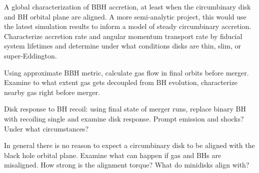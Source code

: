 A global characterization of BBH accretion, at least when the circumbinary disk and BH orbital plane are aligned.  A more semi-analytic project, this would use the latest simulation results to inform a model of steady circumbinary accretion. Characterize accretion rate and angular momentum transport rate by fiducial system lifetimes and determine under what conditions disks are thin, slim, or super-Eddington.

Using approximate BBH metric, calculate gas flow in final orbits before merger. Examine to what extent gas gets decoupled from BH evolution, characterize nearby gas right before merger.  

Disk response to BH recoil: using final state of merger runs, replace binary BH with recoiling single and examine disk response.  Prompt emission and shocks?  Under what circumstances?   

In general there is no reason to expect a circumbinary disk to be aligned with the black hole orbital plane.  Examine what can happen if gas and BHs are misaligned.  How strong is the alignment torque? What do minidisks align with?

